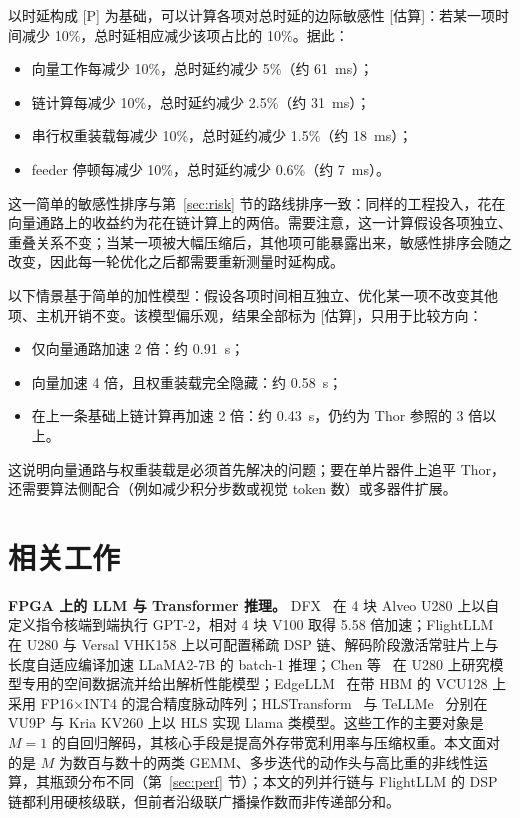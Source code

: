 \documentclass[a4paper,10.5pt]{ctexart}
\newcommand{\tP}{\textsf{[P]}}              %
\newcommand{\tE}{\textsf{[估算]}}           %
\begin{document}
以时延构成 \tP{} 为基础，可以计算各项对总时延的边际敏感性 \tE：若某一项时间减少 10\%，总时延相应减少该项占比的 10\%。据此：
\begin{itemize}
  \item 向量工作每减少 10\%，总时延约减少 5\%（约 61~ms）；
  \item 链计算每减少 10\%，总时延约减少 2.5\%（约 31~ms）；
  \item 串行权重装载每减少 10\%，总时延约减少 1.5\%（约 18~ms）；
  \item feeder 停顿每减少 10\%，总时延约减少 0.6\%（约 7~ms）。
\end{itemize}
这一简单的敏感性排序与第~\ref{sec:risk} 节的路线排序一致：同样的工程投入，花在向量通路上的收益约为花在链计算上的两倍。需要注意，这一计算假设各项独立、重叠关系不变；当某一项被大幅压缩后，其他项可能暴露出来，敏感性排序会随之改变，因此每一轮优化之后都需要重新测量时延构成。

以下情景基于简单的加性模型：假设各项时间相互独立、优化某一项不改变其他项、主机开销不变。该模型偏乐观，结果全部标为 \tE，只用于比较方向：
\begin{itemize}
  \item 仅向量通路加速 2 倍：约 0.91~s；
  \item 向量加速 4 倍，且权重装载完全隐藏：约 0.58~s；
  \item 在上一条基础上链计算再加速 2 倍：约 0.43~s，仍约为 Thor 参照的 3 倍以上。
\end{itemize}
这说明向量通路与权重装载是必须首先解决的问题；要在单片器件上追平 Thor，还需要算法侧配合（例如减少积分步数或视觉 token 数）或多器件扩展。

\section{相关工作}\label{sec:related}

\textbf{FPGA 上的 LLM 与 Transformer 推理。} DFX~\cite{dfx} 在 4 块 Alveo U280 上以自定义指令核端到端执行 GPT-2，相对 4 块 V100 取得 5.58 倍加速；FlightLLM~\cite{flightllm} 在 U280 与 Versal VHK158 上以可配置稀疏 DSP 链、解码阶段激活常驻片上与长度自适应编译加速 LLaMA2-7B 的 batch-1 推理；Chen 等~\cite{chen2024trets} 在 U280 上研究模型专用的空间数据流并给出解析性能模型；EdgeLLM~\cite{edgellm} 在带 HBM 的 VCU128 上采用 FP16$\times$INT4 的混合精度脉动阵列；HLSTransform~\cite{hlstransform} 与 TeLLMe~\cite{tellme} 分别在 VU9P 与 Kria KV260 上以 HLS 实现 Llama 类模型。这些工作的主要对象是 $M=1$ 的自回归解码，其核心手段是提高外存带宽利用率与压缩权重。本文面对的是 $M$ 为数百与数十的两类 GEMM、多步迭代的动作头与高比重的非线性运算，其瓶颈分布不同（第~\ref{sec:perf} 节）；本文的列并行链与 FlightLLM 的 DSP 链都利用硬核级联，但前者沿级联广播操作数而非传递部分和。
\end{document}
